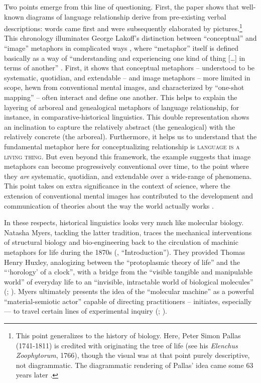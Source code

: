 \documentclass[output=paper]{langscibook}
\begin{document}
Two points emerge from this line of questioning. First, the paper shows that well-known diagrams of language relationship derive from pre-existing verbal descriptions: words came first and were subsequently elaborated by pictures.\footnote{This point generalizes to the history of biology. Here, Peter Simon Pallas (1741-1811) is credited with originating the tree of life (see his \emph{Elenchus Zoophytorum}, 1766), though the visual was at that point purely descriptive, not diagrammatic. The diagrammatic rendering of Pallas' idea came some 63 years later \citep{Eichwald1829}.} This chronology illuminates George Lakoff's distinction between ``conceptual'' and ``image'' metaphors in complicated ways \citep{Lakoff1987}, where ``metaphor'' itself is defined basically as a way of ``understanding and experiencing one kind of thing […] in terms of another'' \citep[455]{LakoffJohnson1980}. First, it shows that conceptual metaphors – understood to be systematic, quotidian, and extendable – and image metaphors – more limited in scope, hewn from conventional mental images, and characterized by ``one-shot mapping'' – often interact and define one another. This helps to explain the layering of arboreal and genealogical metaphors of language relationship, for instance, in comparative-historical linguistics. This double representation shows an inclination to capture the relatively abstract (the genealogical) with the relatively concrete (the arboreal). Furthermore, it helps us to understand that the fundamental metaphor here for conceptualizing relationship is \textsc{language is a living thing}. But even beyond this framework, the example suggests that image metaphors can become progressively conventional over time, to the point where they \emph{are} systematic, quotidian, and extendable over a wide-range of phenomena. This point takes on extra significance in the context of science, where the extension of conventional mental images has contributed to the development and communication of theories about the way the world actually works \citep[see][357]{Boyd1979}.

In these respects, historical linguistics looks very much like molecular biology. Natasha Myers, tackling the latter tradition, traces the mechanical interventions of structural biology and bio-engineering back to the circulation of machinic metaphors for life during the 1870s (\citealt{Myers2015}, ``Introduction''). They provided Thomas Henry Huxley, analogizing between the ``protoplasmic theory of life'' and the ```horology' of a clock'', with a bridge from the ``visible tangible and manipulable world'' of everyday life to an ``invisible, intractable world of biological molecules'' (\citealt{Huxley1880}; \citealt[157]{Myers2014}). Myers ultimately presents the idea of the ``molecular machine'' as a powerful ``material-semiotic actor'' capable of directing practitioners – initiates, especially — to travel certain lines of experimental inquiry (\citealt{Haraway1991}; \citealt[165-168]{Myers2014}).
\end{document}
